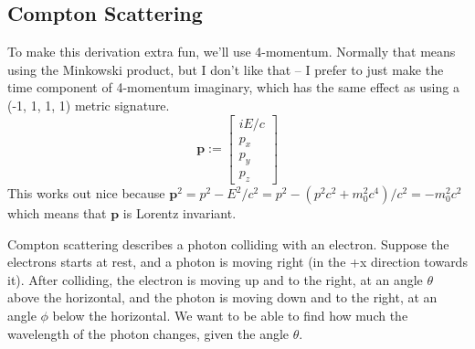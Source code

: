 \documentclass[12pt]{article}
\begin{document}
\subsection{Compton Scattering}
To make this derivation extra fun, we'll use 4-momentum. Normally that means using the Minkowski product, but I don't like that -- I prefer to just make the time component of 4-momentum imaginary, which has the same effect as using a (-1, 1, 1, 1) metric signature.
\[ \boldsymbol{p} := \begin{bmatrix}
    iE/c \\
    p_x \\
    p_y \\
    p_z
\end{bmatrix} \]
This works out nice because $\boldsymbol{p}^2 = p^2 - E^2/c^2 = p^2 - (p^2 c^2 + m_0^2 c^4) / c^2 = - m_0^2 c^2$ which means that $\boldsymbol{p}$ is Lorentz invariant.

Compton scattering describes a photon colliding with an electron. Suppose the  electrons starts at rest, and a photon is moving right (in the +x direction towards it). After colliding, the electron is moving up and to the right, at an angle $\theta$ above the horizontal, and the photon is moving down and to the right, at an angle $\phi$ below the horizontal. We want to be able to find how much the wavelength of the photon changes, given the angle $\theta$.
\end{document}

